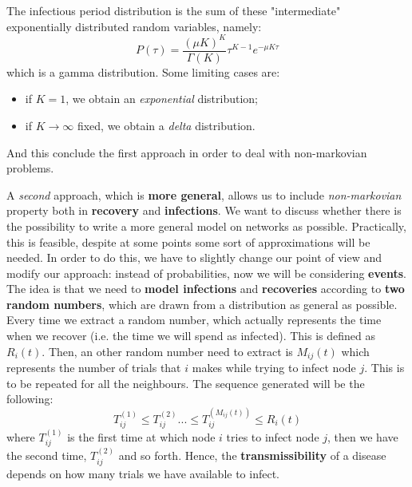 \documentclass[../main/main.tex]{subfiles}
\begin{document}
The infectious period distribution is the sum of these "intermediate" exponentially distributed random variables, namely:
\begin{equation*}
    P(\tau) = \frac{(\mu K)^K}{\Gamma (K)} \tau^{K-1} e^{-\mu K \tau}
\end{equation*}
which is a gamma distribution.
Some limiting cases are:
\begin{itemize}
\item if \( K=1 \), we obtain an \textit{exponential} distribution;
\item if \( K \rightarrow \infty  \) fixed, we obtain a \textit{delta} distribution.
\end{itemize}
And this conclude the first approach in order to deal with non-markovian problems.

A \textit{second} approach, which is \textbf{more general}, allows us to include \textit{non-markovian} property both in \textbf{recovery} and \textbf{infections}.
We want to discuss whether there is the possibility to write a more general model on networks as possible. Practically, this is feasible, despite at some points some sort of approximations will be needed. In order to do this, we have to slightly change our point of view and modify our approach: instead of probabilities, now we will be considering \textbf{events}. The idea is that we need to \textbf{model infections} and \textbf{recoveries} according to \textbf{two random numbers}, which are drawn from a distribution as general as possible.
Every time we extract a random number, which actually represents the time when we recover (i.e. the time we will spend as infected). This is defined as \( R_i (t) \). Then, an other random number need to extract is \( M_{ij} (t) \) which represents the number of trials that \( i \) makes while trying to infect node \( j \). This is to be repeated for all the neighbours.
The sequence generated will be the following:
\begin{equation*}
  T_{ij}^{(1)} \leqslant T_{ij}^{(2)} ... \leqslant T_{ij}^{(M_{ij}(t))} \leqslant R_i(t)
\end{equation*}
where \(  T_{ij}^{(1)} \) is the first time at which node $i$ tries to infect node $j$, then we have the second time, \(  T_{ij}^{(2)} \) and so forth. Hence, the \textbf{transmissibility} of a disease depends on how many trials we have available to infect.
\end{document}
